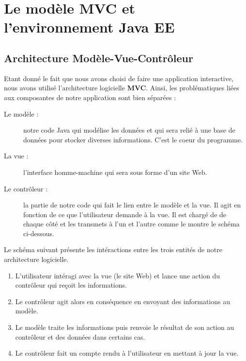 \section{Le modèle MVC et l'environnement Java EE}

\subsection{Architecture Modèle-Vue-Contrôleur}
Etant donné le fait que nous avons choisi de faire une application interactive, nous avons utilisé l'architecture logicielle \textbf{MVC}. Ainsi, les problématiques liées aux composantes de notre application sont bien séparées :
\begin{description}
 \item[Le modèle :] notre code Java qui modélise les données et qui sera relié à une base de données pour stocker diverses informations. C'est le coeur du programme.
 \item[La vue :] l'interface homme-machine qui sera sous forme d'un site Web.
 \item[Le contrôleur :] la partie de notre code qui fait le lien entre le modèle et la vue. Il agit en fonction de ce que l'utilisateur demande à la vue. Il est chargé de de chaque côté et les transmets à l'un et l'autre comme le montre le schéma ci-dessous.\\
\end{description}

Le schéma suivant présente les intéractions entre les trois entités de notre architecture logicielle.

\begin{enumerate}
 \item L'utilisateur intéragi avec la vue (le site Web) et lance une action du contrôleur qui reçoit les informations.
 \item Le contrôleur agit alors en conséquence en envoyant des informations au modèle.
 \item Le modèle traite les informations puis renvoie le résultat de son action au contrôleur et des données dans certains cas.
 \item Le contrôleur fait un compte rendu à l'utilisateur en mettant à jour la vue.
\end{enumerate}

